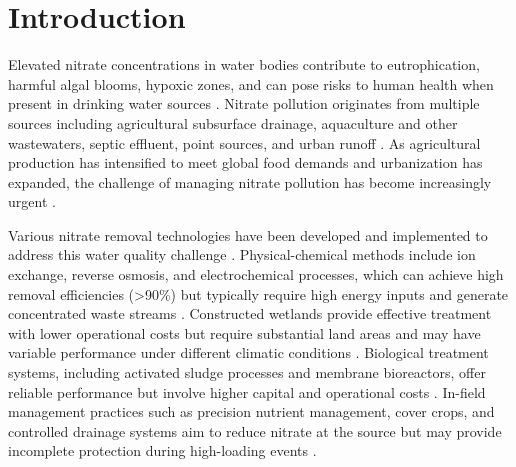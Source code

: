 \documentclass[12pt,a4paper]{article}
\begin{document}

\section{Introduction}

Elevated nitrate concentrations in water bodies contribute to eutrophication, harmful algal blooms, hypoxic zones, and can pose risks to human health when present in drinking water sources \citep{RN1181}. Nitrate pollution originates from multiple sources including agricultural subsurface drainage, aquaculture and other wastewaters, septic effluent, point sources, and urban runoff \citep{RN1181, RN310}.  As agricultural production has intensified to meet global food demands and urbanization has expanded, the challenge of managing nitrate pollution has become increasingly urgent \citep{RN312}.

Various nitrate removal technologies have been developed and implemented to address this water quality challenge \citep{RN625, RN826}. Physical-chemical methods include ion exchange, reverse osmosis, and electrochemical processes, which can achieve high removal efficiencies (>90\%) but typically require high energy inputs and generate concentrated waste streams \citep{RN625}. Constructed wetlands provide effective treatment with lower operational costs but require substantial land areas and may have variable performance under different climatic conditions \citep{RN826}. Biological treatment systems, including activated sludge processes and membrane bioreactors, offer reliable performance but involve higher capital and operational costs \citep{RN625}.  In-field management practices such as precision nutrient management, cover crops, and controlled drainage systems aim to reduce nitrate at the source but may provide incomplete protection during high-loading events \citep{RN826}.
\end{document}
